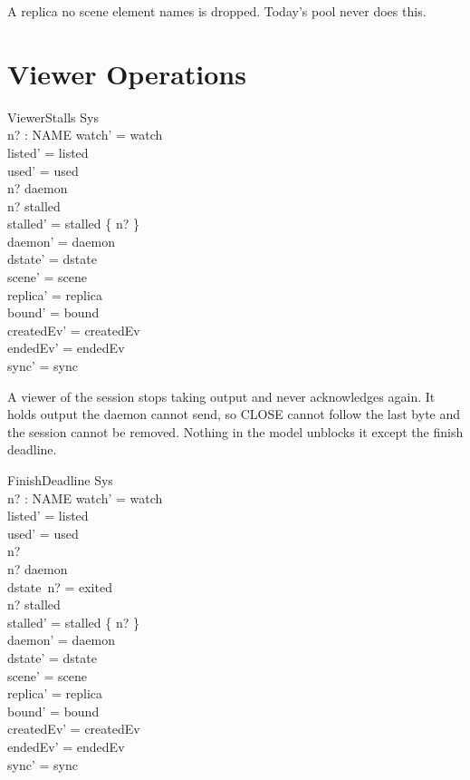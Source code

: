 \documentclass[a4paper,10pt,fleqn]{article}
\begin{document}
A replica no scene element names is dropped.  Today's pool never does
this.

\section{Viewer Operations}

\begin{schema}{ViewerStalls}
  \Delta Sys \\
  n? : NAME
\where
  watch' = watch \\
  listed' = listed \\
  used' = used \\
  n? \in \dom daemon \\
  n? \notin stalled \\
  stalled' = stalled \cup \{ n? \} \\
  daemon' = daemon \\
  dstate' = dstate \\
  scene' = scene \\
  replica' = replica \\
  bound' = bound \\
  createdEv' = createdEv \\
  endedEv' = endedEv \\
  sync' = sync
\end{schema}

A viewer of the session stops taking output and never acknowledges
again.  It holds output the daemon cannot send, so CLOSE cannot follow the
last byte and the session cannot be removed.  Nothing in the model unblocks
it except the finish deadline.

\begin{schema}{FinishDeadline}
  \Delta Sys \\
  n? : NAME
\where
  watch' = watch \\
  listed' = listed \\
  used' = used \\
  n? \in \emptyset \\
  n? \in \dom daemon \\
  dstate~n? = exited \\
  n? \in stalled \\
  stalled' = stalled \setminus \{ n? \} \\
  daemon' = daemon \\
  dstate' = dstate \\
  scene' = scene \\
  replica' = replica \\
  bound' = bound \\
  createdEv' = createdEv \\
  endedEv' = endedEv \\
  sync' = sync
\end{schema}
\end{document}
